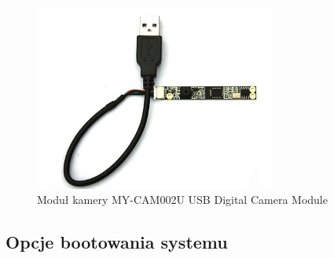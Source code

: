 \begin{figure}[!h]
  \centering
  \includegraphics[width=0.7\textwidth]{img/MY-CAM001U.jpg}
  \caption{Moduł kamery MY-CAM002U USB Digital Camera Module}
  \label{cam-usb}
\end{figure}


\subsection{Opcje bootowania systemu}

